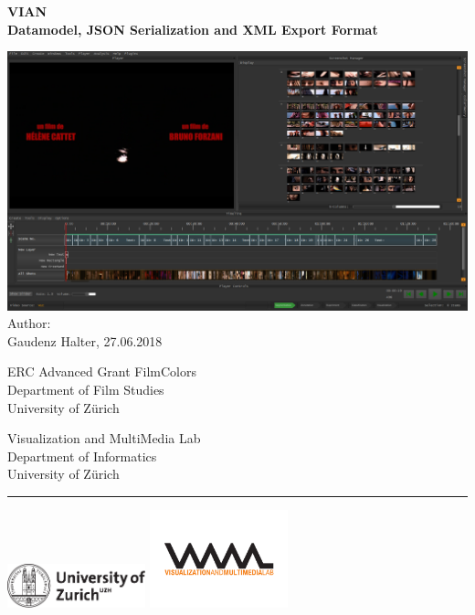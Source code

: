 \documentclass[11pt, a4paper,oneside,chapterprefix=false]{scrbook}
\begin{document}
\frontmatter
\begin{titlepage}
	\setlength{\parindent}{0cm}
	\addtolength{\textheight}{1.0cm}

	\vspace{0.5cm}
	\Huge
	{\textbf \textsf{VIAN\\ \huge Datamodel, JSON Serialization and XML Export Format}}

	\vfill\vfill\vfill
	\vfill
	\includegraphics*[width=1.0\textwidth]{figures/vian_02.png}
	\vfill \vfill \vfill
	\large
	Author:\\
	Gaudenz Halter, 27.06.2018\\
	
	
	
	


	\begin{minipage}[b]{0.5\textwidth}
	ERC Advanced Grant FilmColors\\
	Department of Film Studies \\
	University of Z{\"u}rich
	\end{minipage}
	\begin{minipage}[b]{0.5\textwidth} \raggedleft
	Visualization and MultiMedia Lab \\
	Department of Informatics \\
	University of Z{\"u}rich
	\end{minipage}

	\vfill
	\hrule
	\vspace{0.5cm}
	\includegraphics*[width=0.3\textwidth]{figures/uzh_logo} \hfill
	\includegraphics*[width=0.3\textwidth]{figures/vmml_logo}

\end{titlepage}
\end{document}
